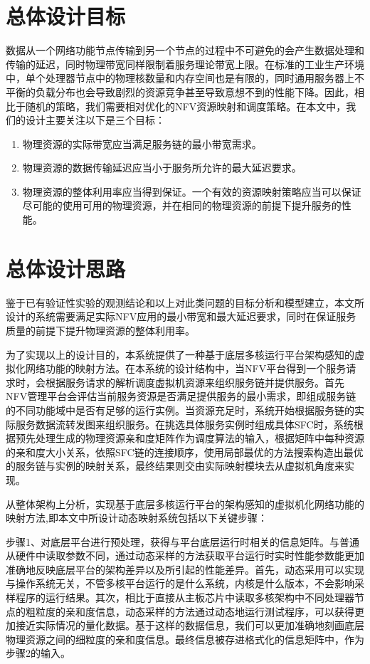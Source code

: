\section{总体设计目标}
数据从一个网络功能节点传输到另一个节点的过程中不可避免的会产生数据处理和传输的延迟，同时物理带宽同样限制着服务理论带宽上限。在标准的工业生产环境中，单个处理器节点中的物理核数量和内存空间也是有限的，同时通用服务器上不平衡的负载分布也会导致剧烈的资源竞争甚至导致意想不到的性能下降。因此，相比于随机的策略，我们需要相对优化的NFV资源映射和调度策略。在本文中，我们的设计主要关注以下是三个目标：
\begin{enumerate}
	\item 物理资源的实际带宽应当满足服务链的最小带宽需求。
	\item 物理资源的数据传输延迟应当小于服务所允许的最大延迟要求。
	\item 物理资源的整体利用率应当得到保证。一个有效的资源映射策略应当可以保证尽可能的使用可用的物理资源，并在相同的物理资源的前提下提升服务的性能。
\end{enumerate}

\section{总体设计思路}
鉴于已有验证性实验的观测结论和以上对此类问题的目标分析和模型建立，本文所设计的系统需要满足实际NFV应用的最小带宽和最大延迟要求，同时在保证服务质量的前提下提升物理资源的整体利用率。

为了实现以上的设计目的，本系统提供了一种基于底层多核运行平台架构感知的虚拟化网络功能的映射方法。在本系统的设计结构中，当NFV平台得到一个服务请求时，会根据服务请求的解析调度虚拟机资源来组织服务链并提供服务。首先NFV管理平台会评估当前服务资源是否满足提供服务的最小需求，即组成服务链的不同功能域中是否有足够的运行实例。当资源充足时，系统开始根据服务链的实际服务数据流转发图来组织服务。在挑选具体服务实例时组成具体SFC时，系统根据预先处理生成的物理资源亲和度矩阵作为调度算法的输入，根据矩阵中每种资源的亲和度大小关系，依照SFC链的连接顺序，使用局部最优的方法搜索构造出最优的服务链与实例的映射关系，最终结果则交由实际映射模块去从虚拟机角度来实现。

从整体架构上分析，实现基于底层多核运行平台的架构感知的虚拟机化网络功能的映射方法,即本文中所设计动态映射系统包括以下关键步骤：

步骤1、对底层平台进行预处理，获得与平台底层运行时相关的信息矩阵。与普通从硬件中读取参数不同，通过动态采样的方法获取平台运行时实时性能参数能更加准确地反映底层平台的架构差异以及所引起的性能差异。首先，动态采用可以实现与操作系统无关，不管多核平台运行的是什么系统，内核是什么版本，不会影响采样程序的运行结果。其次，相比于直接从主板芯片中读取多核架构中不同处理器节点的粗粒度的亲和度信息，动态采样的方法通过动态地运行测试程序，可以获得更加接近实际情况的量化数据。基于这样的数据信息，我们可以更加准确地刻画底层物理资源之间的细粒度的亲和度信息。最终信息被存进格式化的信息矩阵中，作为步骤2的输入。 

